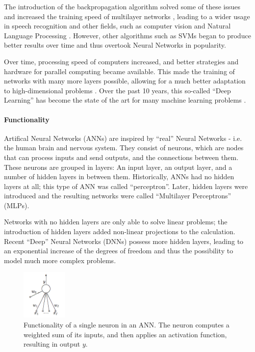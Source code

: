             The introduction of the backpropagation algorithm solved some of these issues and increased the training speed of multilayer networks \cite{werbos}, leading to a wider usage in speech recognition \cite{waibel_hanazawa} and other fields, such as computer vision \cite{srinivas} and Natural Language Processing \cite{goldberg}. 
            However, other algorithms such as SVMs began to produce better results over time and thus overtook Neural Networks in popularity.

            Over time, processing speed of computers increased, and better strategies and hardware for parallel computing became available. 
            This made the training of networks with many more layers possible, allowing for a much better adaptation to high-dimensional problems \cite{hinton_osindero}. 
            Over the past 10 years, this so-called ``Deep Learning'' has become the state of the art for many machine learning problems \cite{nytimes}\cite{schmidhuber_dl}\cite{deng_hinton_kingsbury}.

            \paragraph{Functionality} Artifical Neural Networks (ANNs) are inspired by ``real'' Neural Networks - i.e. the human brain and nervous system. 
            They consist of neurons, which are nodes that can process inputs and send outputs, and the connections between them. 
            These neurons are grouped in layers: An input layer, an output layer, and a number of hidden layers in between them. 
            Historically, ANNs had no hidden layers at all; this type of ANN was called ``perceptron''. 
            Later, hidden layers were introduced and the resulting networks were called ``Multilayer Perceptrons'' (MLPs).
            
            Networks with no hidden layers are only able to solve linear problems; the introduction of hidden layers added non-linear projections to the calculation. 
            Recent ``Deep'' Neural Networks (DNNs) possess more hidden layers, leading to an exponential increase of the degrees of freedom and thus the possibility to model much more complex problems.

            \begin{figure}[htbp]
                \centering
                \includegraphics[width=0.2\textwidth]{figures/neuron.png}
                \caption{Functionality of a single neuron in an ANN. The neuron computes a weighted sum of its inputs, and then applies an activation function, resulting in output $y$. \cite{mackay}}
                \label{fig:neuron}
            \end{figure}


